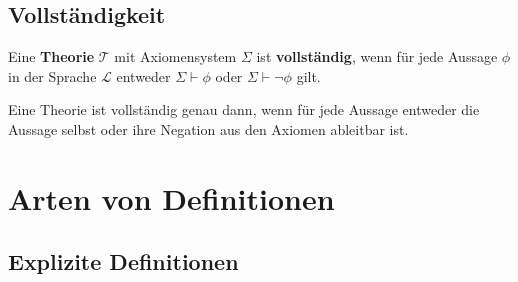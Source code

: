 \documentclass[main.tex]{subfiles}
\begin{document}
\subsection{Vollständigkeit}

\begin{definition}[Vollständigkeit]
Eine \textbf{Theorie} \(\mathcal{T}\) mit Axiomensystem \(\Sigma\) ist \textbf{vollständig}, wenn für jede Aussage \(\phi\) in der Sprache \(\mathcal{L}\) entweder \(\Sigma \vdash \phi\) oder \(\Sigma \vdash \neg \phi\) gilt.
\end{definition}

\begin{remark}
Eine Theorie ist vollständig genau dann, wenn für jede Aussage entweder die Aussage selbst oder ihre Negation aus den Axiomen ableitbar ist.
\end{remark}

\section{Arten von Definitionen}

\subsection{Explizite Definitionen}
\end{document}
